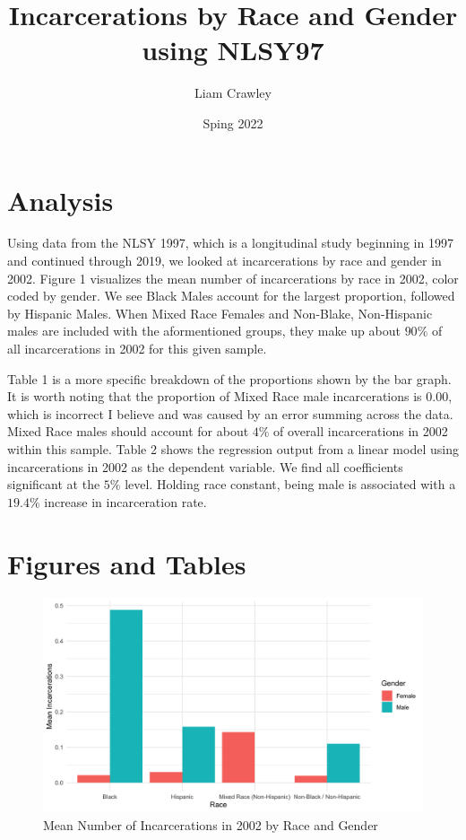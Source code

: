 \documentclass{article}
\author{Liam Crawley}
\title{Incarcerations by Race and Gender using NLSY97}
\date{Sping 2022}
\begin{document}
\maketitle

\section{Analysis}

Using data from the NLSY 1997, which is a longitudinal study beginning
in 1997 and continued through 2019, we looked at incarcerations
by race and gender in 2002. Figure 1 visualizes the mean number of incarcerations
by race in 2002, color coded by gender. We see Black Males account for the largest proportion,
followed by Hispanic Males. When Mixed Race Females and Non-Blake, Non-Hispanic males 
are included with the aformentioned groups, they make up about $90\%$ of all incarcerations
in 2002 for this given sample. 
    
Table 1 is a more specific breakdown of the proportions
shown by the bar graph. It is worth noting that the proportion of Mixed Race male incarcerations
is $0.00$, which is incorrect I believe and was caused by an error summing across the data. Mixed 
Race males should account for about $4\%$ of overall incarcerations in 2002 within this sample.
Table 2 shows the regression output from a linear model using incarcerations in 2002 as the dependent
variable. We find all coefficients significant at the $5\%$ level. Holding
race constant, being male is associated with a $19.4\%$ increase in incarceration rate.
\section{Figures and Tables}

\begin{figure}[H]
    \caption{Mean Number of Incarcerations in 2002 by Race and Gender}
    \begin{center}
        \includegraphics[width=.85\textwidth]{incarcerations_by_racegender.png}
    \end{center}
\end{figure}





\end{document}
